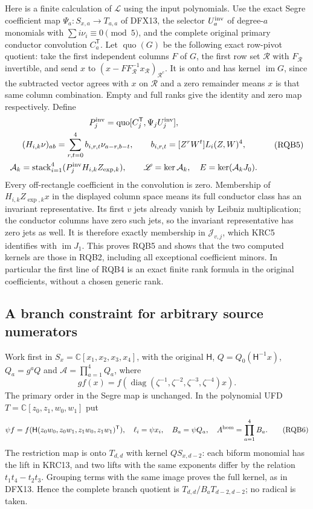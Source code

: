 \documentclass[10pt]{article}
\begin{document}
Here is a finite calculation of $\mathscr L$ using the input polynomials.
Use the exact Segre coefficient map
$\Psi_a:S_{x,a}\to T_{a,a}$ of DFX13, the selector $U_a^{\rm inv}$
of degree-$a$ monomials with $\sum i\nu_i\equiv0\pmod5$, and the
complete original primary conductor convolution $C_a^{\mathsf T}$.
Let $\operatorname{quo}(G)$ be the following exact row-pivot quotient:
take the first independent columns $F$ of $G$, the first row set
$\mathcal R$ with $F_{\mathcal R}$ invertible, and send
$x$ to $(x-FF_{\mathcal R}^{-1}x_{\mathcal R})_{\mathcal R^c}$.
It is onto and has kernel $\operatorname{im}G$, since the subtracted
vector agrees with $x$ on $\mathcal R$ and a zero remainder means
$x$ is that same column combination. Empty and full ranks give the
identity and zero map respectively. Define
\[
\begin{gathered}
 P_j^{\rm inv}=\operatorname{quo}
       [C_j^{\mathsf T},\Psi_j U_j^{\rm inv}],\\
 (H_{i,k}\nu)_{ab}=\sum_{r,t=0}^4b_{i,r,t}\nu_{a-r,b-t},\qquad
 b_{i,r,t}=[Z^rW^t]L_i(Z,W)^4,\\
 \mathcal A_k=\operatorname{stack}_{i=1}^4
                 (P_j^{\rm inv}H_{i,k}Z_{\exp,k}),\qquad
 \mathscr L=\ker\mathcal A_k,\quad E=\ker(\mathcal A_kJ_0).
\end{gathered}\tag{RQB5}
\]
Every off-rectangle coefficient in the convolution is zero. Membership
of $H_{i,k}Z_{\exp,k}x$ in the displayed column space means its full
conductor class has an invariant representative. Its first $v$ jets
already vanish by Leibniz multiplication; the conductor columns have
zero such jets, so the invariant representative has zero jets as well.
It is therefore exactly membership in $\mathscr J_{v,j}$, which
KRC5 identifies with $\operatorname{im}J_1$. This proves RQB5 and
shows that the two computed kernels are those in RQB2, including all
exceptional coefficient minors. In particular the first line of RQB4
is an exact finite rank formula in the original coefficients, without
a chosen generic rank.

\subsection{A branch constraint for arbitrary source numerators}

Work first in $S_x=\mathbb C[x_1,x_2,x_3,x_4]$, with the original
$\mathsf H$, $Q=Q_0(\mathsf H^{-1}x)$, $Q_a=g^aQ$ and
$\mathcal A=\prod_{a=1}^4Q_a$, where
\[
 g f(x)=f(\operatorname{diag}(\zeta^{-1},
               \zeta^{-2},\zeta^{-3},\zeta^{-4})x).
\]
The primary order in the Segre map is unchanged. In the polynomial
UFD $T=\mathbb C[z_0,z_1,w_0,w_1]$ put
\[
 \psi f=f(\mathsf H(z_0w_0,z_0w_1,z_1w_0,z_1w_1)^{\mathsf T}),
 \quad \ell_i=\psi x_i,\quad B_a=\psi Q_a,\quad
 A^{\rm hom}=\prod_{a=1}^4B_a .
 \tag{RQB6}
\]
The restriction map is onto $T_{d,d}$ with kernel $QS_{x,d-2}$:
each biform monomial has the lift in KRC13, and two lifts with
the same exponents differ by the relation $t_1t_4-t_2t_3$.
Grouping terms with the same image proves the full kernel, as in
DFX13. Hence the complete branch quotient is
$T_{d,d}/B_aT_{d-2,d-2}$; no radical is taken.
\end{document}
